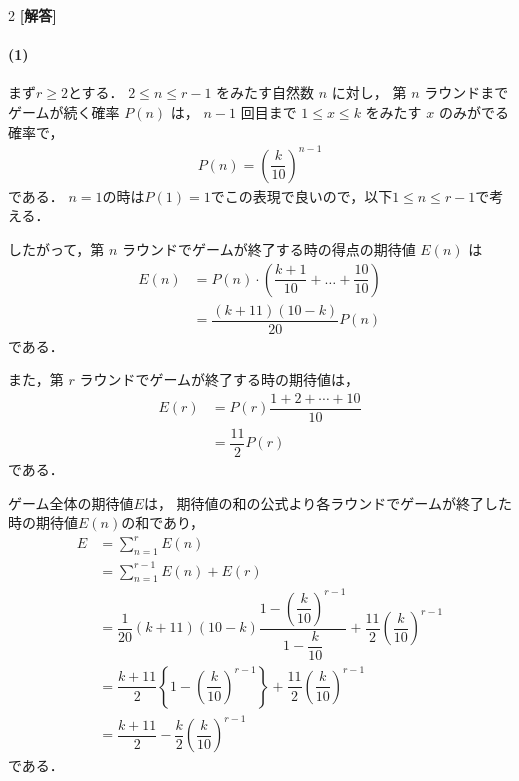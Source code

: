 \documentclass[../../main.tex]{subfiles}
\begin{document}
\setcounter{equation}{0}
\begin{oframed}
  
\end{oframed}
\setlength{\columnseprule}{0.4pt}
\begin{multicols}{2}
  {\bf [解答]}

  \paragraph{(1)}
  まず$r \ge 2$とする．
  $2 \le n \le r-1$ をみたす自然数 $n$ に対し，
  第 $n$ ラウンドまでゲームが続く確率 $P(n)$ は，
  $n-1$ 回目まで $1 \le x \le k$ をみたす $x$ のみがでる確率で，
  \begin{align}
    P(n) = \left(\dfrac{k}{10}\right)^{n-1}
  \end{align}
  である．
  $n=1$の時は$P(1)=1$でこの表現で良いので，以下$1 \le n \le r-1$で考える．

  したがって，第 $n$ ラウンドでゲームが終了する時の得点の期待値 $E(n)$ は
  \begin{align}
    E(n)
    & = P(n) \cdot \left(\dfrac{k+1}{10} + \dots + \dfrac{10}{10}\right) \\
    & = \dfrac{(k+11)(10-k)}{20} P(n) \label{eq:1}
  \end{align}
  である．

  また，第 $r$ ラウンドでゲームが終了する時の期待値は，
  \begin{align}
    E(r)
    & = P(r)\dfrac{1+2+\cdots+10}{10} \\
    & = \dfrac{11}{2}P(r)
  \end{align}
  である．

  ゲーム全体の期待値$E$は，
  期待値の和の公式より各ラウンドでゲームが終了した時の期待値$E(n)$の和であり，
  \begin{align}
    E
    & = \sum_{n=1}^{r} E(n)                                                                                                               \\
    & = \sum_{n=1}^{r-1} E(n) + E(r)                                                                                                      \\
    & = \dfrac{1}{20} (k+11)(10-k) \dfrac{1-\left(\dfrac{k}{10}\right)^{r-1}}{1-\dfrac{k}{10}} + \dfrac{11}{2} \left(\dfrac{k}{10}\right)^{r-1} \\
    & = \dfrac{k+11}{2} \left\{ 1-\left(\dfrac{k}{10}\right)^{r-1} \right\} + \dfrac{11}{2} \left(\dfrac{k}{10}\right)^{r-1}                  \\
    & = \dfrac{k+11}{2} - \dfrac{k}{2} \left(\dfrac{k}{10}\right)^{r-1} \label{eq:2}
  \end{align}
  である．


\end{multicols}
\end{document}
